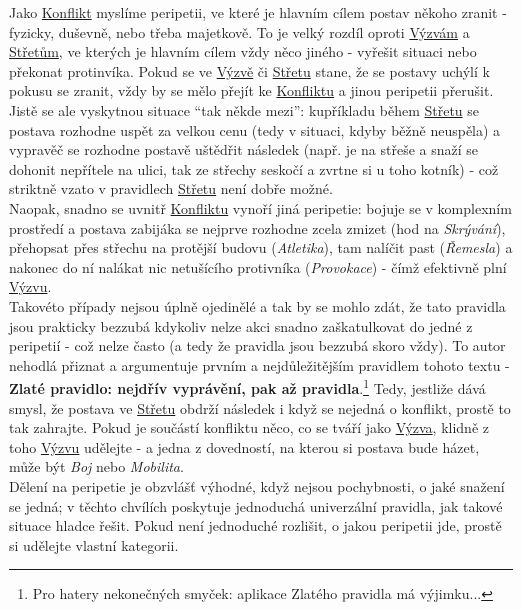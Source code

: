 Jako \underline{Konflikt} myslíme peripetii, ve které je hlavním cílem postav někoho zranit - fyzicky, duševně, nebo třeba majetkově. To je velký rozdíl oproti \underline{Výzvám} a \underline{Střetům}, ve kterých je hlavním cílem vždy něco jiného - vyřešit situaci nebo překonat protinvíka. Pokud se ve \underline{Výzvě} či \underline{Střetu} stane, že se postavy uchýlí k pokusu se zranit, vždy by se mělo přejít ke \underline{Konfliktu} a jinou peripetii přerušit.\\
Jistě se ale vyskytnou situace ``tak někde mezi'': kupříkladu během \underline{Střetu} se postava rozhodne uspět za velkou cenu (tedy v situaci, kdyby běžně neuspěla) a vypravěč se rozhodne postavě uštědřit následek (např. je na střeše a snaží se dohonit nepřítele na ulici, tak ze střechy seskočí a zvrtne si u toho kotník) - což striktně vzato v pravidlech \underline{Střetu} není dobře možné.\\
Naopak, snadno se uvnitř \underline{Konfliktu} vynoří jiná peripetie: bojuje se v komplexním prostředí a postava zabijáka se nejprve rozhodne zcela zmizet (hod na \textit{Skrývání}), přehopsat přes střechu na protější budovu (\textit{Atletika}), tam nalíčit past (\textit{Řemesla}) a nakonec do ní nalákat nic netušícího protivníka (\textit{Provokace}) - čímž efektivně plní \underline{Výzvu}.\\
Takovéto případy nejsou úplně ojedinělé a tak by se mohlo zdát, že tato pravidla jsou prakticky bezzubá kdykoliv nelze akci snadno zaškatulkovat do jedné z peripetií - což nelze často (a tedy že pravidla jsou bezzubá skoro vždy). To autor nehodlá přiznat a argumentuje prvním a nejdůležitějším pravidlem tohoto textu - \textbf{Zlaté pravidlo: nejdřív vyprávění, pak až pravidla}.\footnote{Pro hatery nekonečných smyček: aplikace Zlatého pravidla má výjimku...} Tedy, jestliže dává smysl, že postava ve \underline{Střetu} obdrží následek i když se nejedná o konflikt, prostě to tak zahrajte. Pokud je součástí konfliktu něco, co se tváří jako \underline{Výzva}, klidně z toho \underline{Výzvu} udělejte - a jedna z dovedností, na kterou si postava bude házet, může být \textit{Boj} nebo \textit{Mobilita}.\\

Dělení na peripetie je obzvlášť výhodné, když nejsou pochybnosti, o jaké snažení se jedná; v těchto chvílích poskytuje jednoduchá univerzální pravidla, jak takové situace hladce řešit. Pokud není jednoduché rozlišit, o jakou peripetii jde, prostě si udělejte vlastní kategorii.



